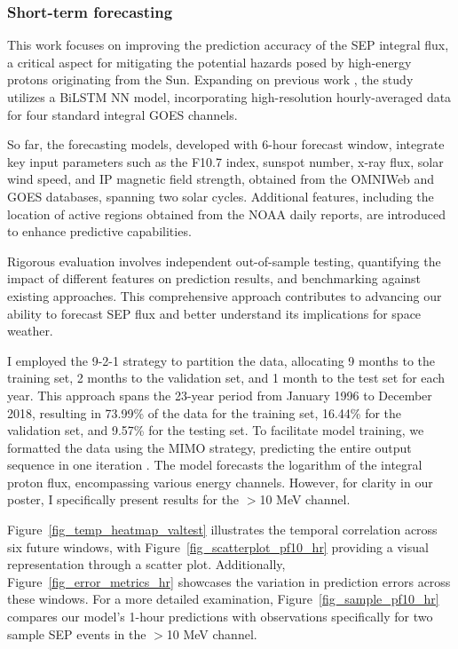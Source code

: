 \subsubsection{Short-term forecasting}
This work focuses on improving the prediction accuracy of the SEP integral flux, a critical aspect for mitigating the potential hazards posed by high-energy protons originating from the Sun. Expanding on previous work \citep{mnedal_2023a}, the study utilizes a BiLSTM NN model, incorporating high-resolution hourly-averaged data for four standard integral GOES channels.

So far, the forecasting models, developed with 6-hour forecast window, integrate key input parameters such as the F10.7 index, sunspot number, x-ray flux, solar wind speed, and IP magnetic field strength, obtained from the OMNIWeb and GOES databases, spanning two solar cycles. Additional features, including the location of active regions obtained from the NOAA daily reports, are introduced to enhance predictive capabilities.

Rigorous evaluation involves independent out-of-sample testing, quantifying the impact of different features on prediction results, and benchmarking against existing approaches. This comprehensive approach contributes to advancing our ability to forecast SEP flux and better understand its implications for space weather.

I employed the 9-2-1 strategy to partition the data, allocating 9 months to the training set, 2 months to the validation set, and 1 month to the test set for each year. This approach spans the 23-year period from January 1996 to December 2018, resulting in 73.99\% of the data for the training set, 16.44\% for the validation set, and 9.57\% for the testing set. To facilitate model training, we formatted the data using the MIMO
strategy, predicting the entire output sequence in one iteration \citep{benson_2020}.
The model forecasts the logarithm of the integral proton flux, encompassing various energy channels. However, for clarity in our poster, I specifically present results for the $>$10 MeV channel.

Figure~\ref{fig_temp_heatmap_valtest} illustrates the temporal correlation across six future windows, with Figure~\ref{fig_scatterplot_pf10_hr} providing a visual representation through a scatter plot. Additionally, Figure~\ref{fig_error_metrics_hr} showcases the variation in prediction errors across these windows. For a more detailed examination, Figure~\ref{fig_sample_pf10_hr} compares our model's 1-hour predictions with observations specifically for two sample SEP events in the $>$10 MeV channel.

